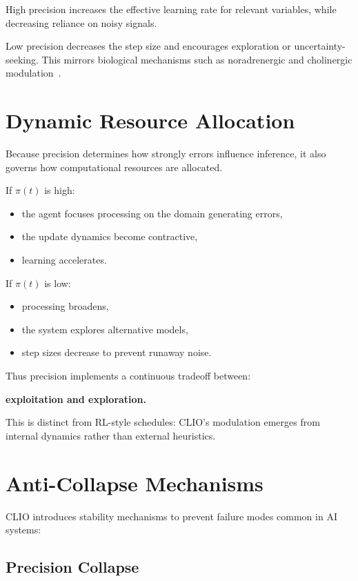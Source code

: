 \documentclass[12pt,oneside]{book}
\theoremstyle{plain}
\theoremstyle{definition}
\let\citep\parencite
\begin{document}
High precision increases the effective learning rate for relevant variables,
while decreasing reliance on noisy signals.

Low precision decreases the step size and encourages exploration or uncertainty-seeking.
This mirrors biological mechanisms such as noradrenergic and cholinergic
modulation~\citep{solms2021hidden}.

\section{Dynamic Resource Allocation}

Because precision determines how strongly errors influence inference,
it also governs how computational resources are allocated.

If $\pi(t)$ is high:

\begin{itemize}
    \item the agent focuses processing on the domain generating errors,
    \item the update dynamics become contractive,
    \item learning accelerates.
\end{itemize}

If $\pi(t)$ is low:

\begin{itemize}
    \item processing broadens,
    \item the system explores alternative models,
    \item step sizes decrease to prevent runaway noise.
\end{itemize}

Thus precision implements a continuous tradeoff between:

\begin{center}
    \textbf{exploitation and exploration.}
\end{center}

This is distinct from RL-style schedules: CLIO’s modulation emerges from internal
dynamics rather than external heuristics.

\section{Anti-Collapse Mechanisms}

CLIO introduces stability mechanisms to prevent failure modes common in AI
systems:

\subsection{Precision Collapse}
\end{document}
